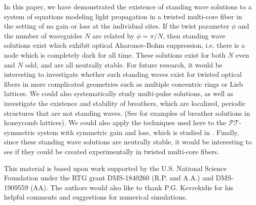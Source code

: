 \documentclass[reprint, amsmath,amssymb,aps]{revtex4-2}
\begin{document}
In this paper, we have demonstrated the existence of standing wave solutions to a system of equations modeling light propagation in a twisted multi-core fiber in the setting of no gain or loss at the individual sites. If the twist parameter $\phi$ and the number of waveguides $N$ are related by $\phi = \pi/N$, then standing wave solutions exist which exhibit optical Aharonov-Bohm suppression, i.e. there is a node which is completely dark for all time. These solutions exist for both $N$ even and $N$ odd, and are all neutrally stable. For future research, it would be interesting to investigate whether such standing waves exist for twisted optical fibers in more complicated geometries such as multiple concentric rings or Lieb lattices. We could also systematically study multi-pulse solutions, as well as investigate the existence and stability of breathers, which are localized, periodic structures that are not standing waves. (See \cite{Lumer2013} for examples of breather solutions in honeycomb lattices). We could also apply the techniques used here to the $\mathcal{PT}$-symmetric system with symmetric gain and loss, which is studied in \cite{castro2016}. Finally, since these standing wave solutions are neutrally stable, it would be interesting to see if they could be created experimentally in twisted multi-core fibers.

\begin{acknowledgments}
This material is based upon work supported by the U.S. National Science Foundation under the RTG grant DMS-1840260 (R.P. and A.A.) and DMS-1909559 (AA). The authors would also like to thank P.G. Kevrekidis for his helpful comments and suggestions for numerical simulations.
\end{acknowledgments}



\end{document}
